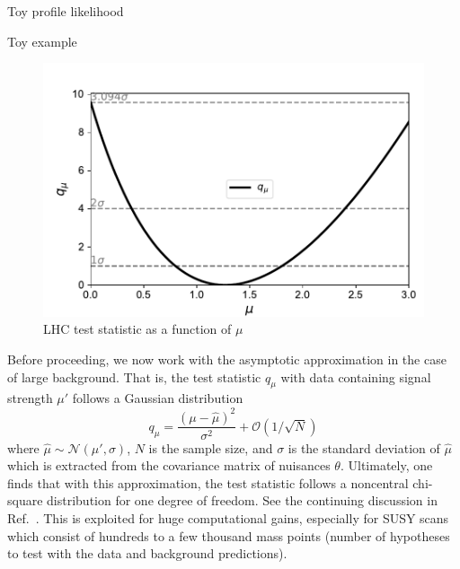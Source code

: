 \begin{section}{Toy profile likelihood}
\begin{subsection}{Toy example}
\begin{figure}[!htb]
    \centering
    \includegraphics[width=0.80\linewidth]{figs/toy_statistics/qmu_vs_mu.pdf}
    \caption{
LHC test statistic as a function of $\mu$
    }
    \label{fig:toystat:qmu}
\end{figure}

Before proceeding, we now work with the asymptotic approximation in the case of large
background. That is, the test statistic $q_\mu$ with data containing signal strength $\mu'$
follows a Gaussian distribution 
\begin{equation}
    q_\mu = \frac{(\mu-\hat{\mu})^2}{\sigma^2} + \mathcal{O}(1/\sqrt{N})
\end{equation}
where $\hat{\mu}\sim \mathcal{N}(\mu',\sigma)$, $N$ is the sample size,
and $\sigma$ is the standard deviation of $\hat{\mu}$ which is extracted
from the covariance matrix of nuisances $\theta$. Ultimately, one finds that
with this approximation, the test statistic follows a noncentral chi-square distribution
for one degree of freedom. See the continuing discussion in Ref.~\cite{STAT:Cowan2010js}. 
This is exploited for huge computational gains, especially for SUSY scans which consist
of hundreds to a few thousand mass points (number of hypotheses to test with the data 
and background predictions).


\end{subsection}
\end{section}

